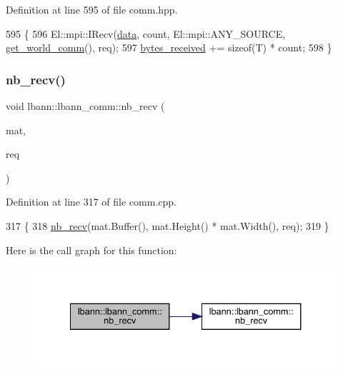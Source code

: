 Definition at line 595 of file comm.\+hpp.


\begin{DoxyCode}
595                                                                                \{
596     El::mpi::IRecv(\hyperlink{namespacelbann_1_1cnpy__utils_a9ac86d96ccb1f8b4b2ea16441738781f}{data}, count, El::mpi::ANY\_SOURCE, \hyperlink{classlbann_1_1lbann__comm_a0493f1f0c42b95674daacf5288fdb073}{get\_world\_comm}(), req);
597     \hyperlink{classlbann_1_1lbann__comm_afb99f57f7eafc0695bf28e6c26a8120f}{bytes\_received} += \textcolor{keyword}{sizeof}(T) * count;
598   \}
\end{DoxyCode}
\mbox{\label{classlbann_1_1lbann__comm_a4e703fa356dd7807fda82d1d1eb81e1d}} 
\subsubsection{\texorpdfstring{nb\+\_\+recv()}{nb\_recv()}\hspace{0.1cm}{\footnotesize\ttfamily [8/9]}}
{\footnotesize\ttfamily void lbann\+::lbann\+\_\+comm\+::nb\+\_\+recv (\begin{DoxyParamCaption}\item[{\hyperlink{base_8hpp_a68f11fdc31b62516cb310831bbe54d73}{Mat} \&}]{mat,  }\item[{El\+::mpi\+::\+Request$<$ Data\+Type $>$ \&}]{req }\end{DoxyParamCaption})}



Definition at line 317 of file comm.\+cpp.


\begin{DoxyCode}
317                                                               \{
318   \hyperlink{classlbann_1_1lbann__comm_aac24e8802602c73efddb455274e158f4}{nb\_recv}(mat.Buffer(), mat.Height() * mat.Width(), req);
319 \}
\end{DoxyCode}
Here is the call graph for this function\+:\nopagebreak
\begin{figure}[H]
\begin{center}
\leavevmode
\includegraphics[width=334pt]{classlbann_1_1lbann__comm_a4e703fa356dd7807fda82d1d1eb81e1d_cgraph}
\end{center}
\end{figure}
\mbox{\label{classlbann_1_1lbann__comm_a105c0fa7997f23637cbd03d566748bca}} 

